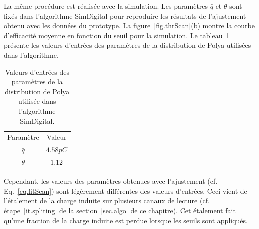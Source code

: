  La même procédure est réalisée avec la simulation. Les paramètres $\bar q$ et $\theta$ sont fixés dans l'algorithme SimDigital pour reproduire les résultats de l'ajustement obtenu avec les données du prototype. La figure~\ref{fig.thrScan}(b) montre la courbe d'efficacité moyenne en fonction du seuil pour la simulation. Le tableau~\ref{tab.inputPolya} présente les valeurs d'entrées des paramètres de la distribution de Polya utilisées dans l'algorithme.
\begin{table}[!ht]
  \begin{center}
    \begin{tabular}{c|c}
      \rowcolor{black!20!white}Paramètre & Valeur\\
      \rowcolor{black!5!white}\hline
      \rowcolor{black!5!white}$\bar q$ & $4.58 pC$\\
      \rowcolor{black!5!white}$\theta$ & $1.12$\\
    \end{tabular}
  \end{center}
  \caption{Valeurs d'entrées des paramètres de la distribution de Polya utilisée dans l'algorithme SimDigital.}
  \label{tab.inputPolya}
\end{table}
 Cependant, les valeurs des paramètres obtenues avec l'ajustement (cf. Eq.~\ref{eq.fitScan}) sont légèrement différentes des valeurs d'entrées. Ceci vient de l'étalement de la charge induite sur plusieurs canaux de lecture (cf. étape~\ref{it.spliting} de la section~\ref{sec.algo} de ce chapitre). Cet étalement fait qu'une fraction de la charge induite est perdue lorsque les seuils sont appliqués.

